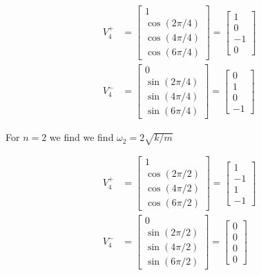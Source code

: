 \documentclass[letter, 10pts]{article}
\begin{document}
\begin{align*}
	V^{+}_4 &= 
		\begin{bmatrix} 1 \\ 
		\cos(2 \pi   / 4) \\ 
	\cos (4 \pi / 4) \\ 
\cos (6 \pi  / 4 )\end{bmatrix}  
= 
	\begin{bmatrix} 1\\ 0 \\ -1 \\ 0 \end{bmatrix} 
		\\
	V^{-}_4 &= 
		\begin{bmatrix} 0 \\ 
		\sin(2 \pi  / 4) \\ 
	\sin (4 \pi  / 4 ) \\ 
\sin(6 \pi / 4)\end{bmatrix} 
=
\begin{bmatrix} 0 \\ 1 \\ 0 \\ -1 \end{bmatrix} 
\end{align*}

For $n = 2$ we find we find $\omega_2 = 2 \sqrt{k / m} $


\begin{align*}
	V^{+}_4 &= 
		\begin{bmatrix} 1 \\ 
		\cos(2 \pi   / 2) \\ 
	\cos (4 \pi / 2) \\ 
\cos (6 \pi  / 2 )\end{bmatrix}  
= 
	\begin{bmatrix} 1\\ -1 \\ 1 \\ -1 \end{bmatrix} 
		\\
	V^{-}_4 &= 
		\begin{bmatrix} 0 \\ 
		\sin(2 \pi  / 2) \\ 
	\sin (4 \pi  / 2 ) \\ 
\sin(6 \pi / 2)\end{bmatrix} 
=
\begin{bmatrix} 0 \\ 0 \\ 0 \\ 0 \end{bmatrix} 
\end{align*}
\end{document}
